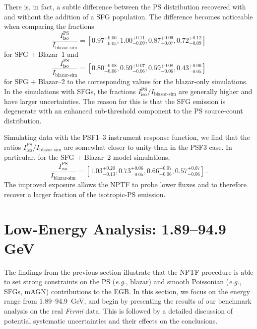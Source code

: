There is, in fact, a subtle difference between the PS distribution recovered with and without the addition of a SFG population.  The difference becomes noticeable when comparing the fractions 
\begin{equation}
\frac{I_\text{iso}^\text{PS}}{I_\text{blazar-sim}} = [0.97_{-0.05}^{+0.06}, 1.00_{-0.09}^{+0.11}, 0.87_{-0.07}^{+0.09}, 0.72_{-0.09}^{+0.12}] \nonumber
\end{equation}
for SFG + Blazar--1 and 
\begin{equation}
\frac{I_\text{iso}^\text{PS}}{ I_\text{blazar-sim} }= [0.80_{-0.06}^{+0.08}, 0.59_{-0.06}^{+0.07}, 0.59_{-0.06}^{+0.08}, 0.43_{-0.05}^{+0.06}] \nonumber
\end{equation} 
for SFG + Blazar--2 to the corresponding values for the blazar-only simulations.  In the simulations with SFGs, the fractions  $I_\text{iso}^\text{PS} / I_\text{blazar-sim}$ are generally higher and have larger uncertainties.  The reason for this is that the SFG emission is degenerate with an enhanced sub-threshold component to the PS source-count distribution.

Simulating data with the PSF1--3 instrument response function, we find that the ratios $I_\text{iso}^\text{PS} / I_\text{blazar-sim}$ are somewhat closer to unity than in the PSF3 case.  In particular, for the SFG  +  Blazar--2 model simulations,
\begin{equation}
\frac{I_\text{iso}^\text{PS}}{ I_\text{blazar-sim}} = [1.03_{-0.13}^{+0.20}, 0.73_{-0.05}^{+0.06}, 0.66_{-0.06}^{+0.07}, 0.57_{-0.06}^{+0.07}] \,.  \nonumber
\end{equation}
The improved exposure allows the NPTF to probe lower fluxes and to therefore recover a larger fraction of the isotropic-PS emission. 


\section{Low-Energy Analysis: 1.89--94.9 GeV} 
\label{sec:lowenergy}

The findings from the previous section illustrate that the NPTF procedure is able to set strong constraints on the PS (\emph{e.g.}, blazar) and smooth Poissonian (\emph{e.g.}, SFGs, mAGN) contributions to the EGB.
 In this section, we focus on the energy range from 1.89--94.9~GeV, and begin by presenting the results of our benchmark analysis on the real \emph{Fermi} data.  This is followed by a detailed discussion of potential systematic uncertainties and their effects on the conclusions.  

